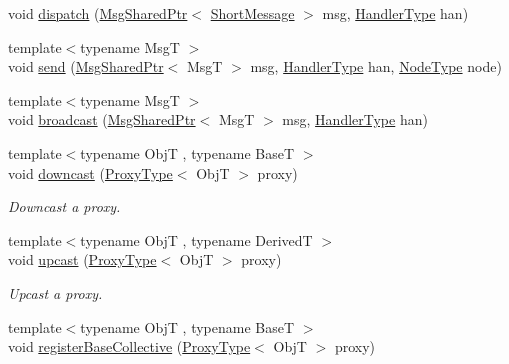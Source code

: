 \begin{DoxyCompactItemize}
void \hyperlink{structvt_1_1objgroup_1_1_obj_group_manager_ad3e01d20b90d5447445538541025aa4b}{dispatch} (\hyperlink{namespacevt_ab2b3d506ec8e8d1540aede826d84a239}{Msg\+Shared\+Ptr}$<$ \hyperlink{namespacevt_a1125ac1da6c0bbf141e0ea0739d7602d}{Short\+Message} $>$ msg, \hyperlink{namespacevt_af64846b57dfcaf104da3ef6967917573}{Handler\+Type} han)
\item 
{\footnotesize template$<$typename MsgT $>$ }\\void \hyperlink{structvt_1_1objgroup_1_1_obj_group_manager_a58abda8b7d1372bea7ca061402e69c75}{send} (\hyperlink{namespacevt_ab2b3d506ec8e8d1540aede826d84a239}{Msg\+Shared\+Ptr}$<$ MsgT $>$ msg, \hyperlink{namespacevt_af64846b57dfcaf104da3ef6967917573}{Handler\+Type} han, \hyperlink{namespacevt_a866da9d0efc19c0a1ce79e9e492f47e2}{Node\+Type} node)
\item 
{\footnotesize template$<$typename MsgT $>$ }\\void \hyperlink{structvt_1_1objgroup_1_1_obj_group_manager_a4bd17271d7a5d298ac74c73eedde4d8d}{broadcast} (\hyperlink{namespacevt_ab2b3d506ec8e8d1540aede826d84a239}{Msg\+Shared\+Ptr}$<$ MsgT $>$ msg, \hyperlink{namespacevt_af64846b57dfcaf104da3ef6967917573}{Handler\+Type} han)
\item 
{\footnotesize template$<$typename ObjT , typename BaseT $>$ }\\void \hyperlink{structvt_1_1objgroup_1_1_obj_group_manager_ab7ea99ad2668a99debd687a20bb9e3dd}{downcast} (\hyperlink{structvt_1_1objgroup_1_1_obj_group_manager_aea65eef52f240a52210132eef5ce591f}{Proxy\+Type}$<$ ObjT $>$ proxy)
\begin{DoxyCompactList}\small\item\em Downcast a proxy. \end{DoxyCompactList}\item 
{\footnotesize template$<$typename ObjT , typename DerivedT $>$ }\\void \hyperlink{structvt_1_1objgroup_1_1_obj_group_manager_abddd0f80c5b0f625a4ed487414c3b39b}{upcast} (\hyperlink{structvt_1_1objgroup_1_1_obj_group_manager_aea65eef52f240a52210132eef5ce591f}{Proxy\+Type}$<$ ObjT $>$ proxy)
\begin{DoxyCompactList}\small\item\em Upcast a proxy. \end{DoxyCompactList}\item 
{\footnotesize template$<$typename ObjT , typename BaseT $>$ }\\void \hyperlink{structvt_1_1objgroup_1_1_obj_group_manager_a6e869a6e38c7fe4e176814ca93ecf36e}{register\+Base\+Collective} (\hyperlink{structvt_1_1objgroup_1_1_obj_group_manager_aea65eef52f240a52210132eef5ce591f}{Proxy\+Type}$<$ ObjT $>$ proxy)

\end{DoxyCompactItemize}
